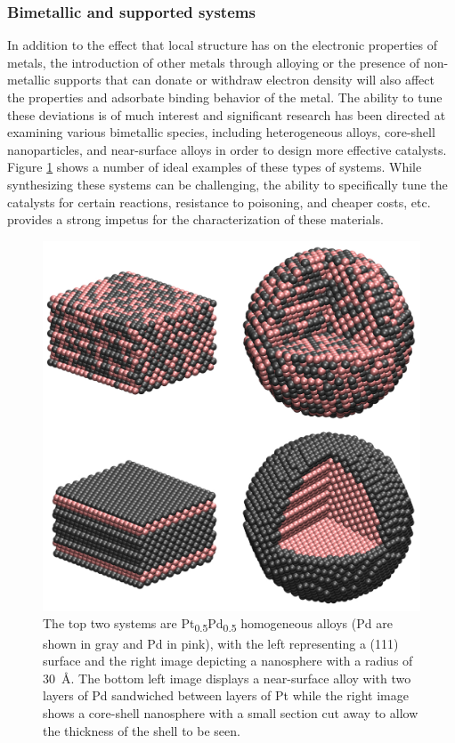 \subsubsection{Bimetallic and supported systems}
In addition to the effect that local structure has on the electronic properties
of metals, the introduction of other metals through alloying or the presence of
non-metallic  supports that can donate or withdraw electron density will also
affect the properties and adsorbate binding behavior of the metal. The ability
to tune these deviations is of much interest and significant research has been
directed at examining various bimetallic species, including heterogeneous
alloys,\citep{Stamenkovic:2007kk, Yu:2013fr} core-shell
nanoparticles,\citep{Tao:2008aa, Wang:2015qb, Huang:2012ul} and near-surface
alloys\citep{Jan-Knudsen:2007fe,Stephens:2011bv} in order to design more effective
catalysts.  Figure \ref{fig:bimetallic} shows a number of ideal examples of
these types of systems. While synthesizing these systems can be challenging,
the ability to specifically tune the catalysts for certain reactions,
resistance to poisoning\citep{Sharma:0ly, Yu:2013fr}, and cheaper
costs\citep{Li:0hl, Zhao:0qf}, etc. provides a strong impetus for the
characterization of these materials.

\begin{figure}[p!]
  \includegraphics[width=\linewidth]{../figures/chap1/bimetallic.pdf}
\caption{The top two systems are Pt\textsubscript{0.5}Pd\textsubscript{0.5}
homogeneous alloys (Pd are shown in gray and Pd in pink), with the left
representing a (111) surface and the right image depicting a nanosphere with a
radius of 30~\AA. The bottom left image displays a near-surface alloy with two
layers of Pd sandwiched between layers of Pt while the right image shows a
core-shell nanosphere with a small section cut away to allow the thickness of
the shell to be seen.}
\label{fig:bimetallic} 
\end{figure}

